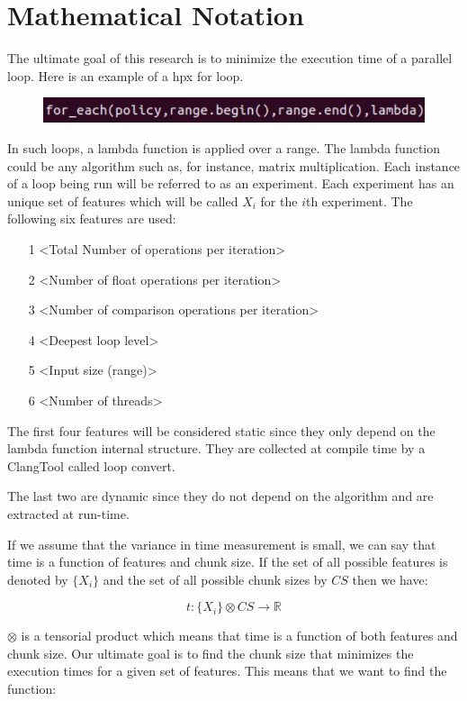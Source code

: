 \section{Mathematical Notation}
The ultimate goal of this research is to minimize the execution time of a parallel loop. Here is an example of a hpx for loop. 

\begin{figure}[h]
	\centering
	\includegraphics[scale=0.8]{images/for_each_call.pdf}
\end{figure}

In such loops, a lambda function is applied over a range. The lambda function could be any algorithm such as, for instance, matrix multiplication. Each instance of a loop being run will be referred to as an experiment. Each experiment has an unique set of features which will be called $X_i$ for the $i$th experiment. The following six features are used:

\begin{itemize}
	\item[1] <Total Number of operations per iteration>
	\item[2] <Number of float operations per iteration>
	\item[3] <Number of comparison operations per iteration>
	\item[4] <Deepest loop level>
	\item[5] <Input size (range)>
	\item[6] <Number of threads>
\end{itemize}

The first four features will be considered static since they only depend on the lambda function internal structure. They are collected at compile time by a ClangTool called loop convert.

The last two are dynamic since they do not depend on the algorithm and are extracted at run-time.

If we assume that the variance in time measurement is small, we can say that time is a function of features and chunk size. If the set of all possible features is denoted by $\{X_i\}$ and the set of all possible chunk sizes by $CS$ then we have:

$$t:\{X_i\} \otimes CS \rightarrow \mathbb{R}$$

$\otimes$ is a tensorial product which means that time is a function of both features and chunk size.
Our ultimate goal is to find the chunk size that minimizes the execution times for a given set of features. This means that we want to find the function:

